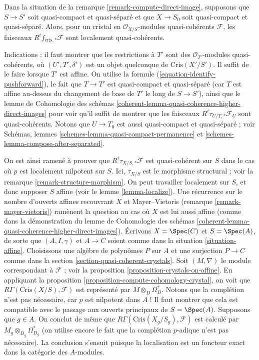 \begin{remark}
\label{remark-quasi-coherent}
Dans la situation de la remarque \ref{remark-compute-direct-image},
supposons que $S \to S'$ soit quasi-compact et quasi-séparé et
que $X \to S_0$ soit quasi-compact et quasi-séparé. Alors, pour un cristal
en $\mathcal{O}_{X/S}$-modules quasi-cohérents $\mathcal{F}$,
les faisceaux $R^if_{\text{cris}, *}\mathcal{F}$ sont localement quasi-cohérents.

\medskip\noindent
Indications : il faut montrer que les restrictions à $T'$ sont des
$\mathcal{O}_{T'}$-modules quasi-cohérents, où $(U', T', \delta')$ est un objet quelconque de
$\text{Cris}(X'/S')$. Il suffit de le faire lorsque $T'$ est affine.
On utilise la formule (\ref{equation-identify-pushforward}),
le fait que $T \to T'$ est quasi-compact et quasi-séparé (car $T$
est affine au-dessus du changement de base de $T'$ le long de $S \to S'$), ainsi que le
lemme de Cohomologie des schémas
\ref{coherent-lemma-quasi-coherence-higher-direct-images}
pour voir qu'il suffit de montrer que les faisceaux
$R^i\tau_{U/T, *}\mathcal{F}_U$ sont quasi-cohérents.
Notons que $U \to T_0$ est aussi quasi-compact et quasi-séparé ; voir
Schémas, lemmes \ref{schemes-lemma-quasi-compact-permanence} et
\ref{schemes-lemma-compose-after-separated}.

\medskip\noindent
On est ainsi ramené à prouver que $R^i\tau_{X/S, *}\mathcal{F}$
est quasi-cohérent sur $S$ dans le cas où $p$ est localement nilpotent sur $S$. Ici,
$\tau_{X/S}$ est le morphisme structural ; voir la
remarque \ref{remark-structure-morphism}.
On peut travailler localement sur $S$, et donc supposer $S$ affine
(voir le lemme \ref{lemma-localize}). Une récurrence sur le nombre
d'ouverts affines recouvrant $X$ et Mayer--Vietoris
(remarque \ref{remark-mayer-vietoris}) ramènent la question
au cas où $X$ est lui aussi affine (comme dans la démonstration du
lemme de Cohomologie des schémas
\ref{coherent-lemma-quasi-coherence-higher-direct-images}).
Écrivons $X = \Spec(C)$ et $S = \Spec(A)$, de sorte que $(A, I, \gamma)$ et
$A \to C$ soient comme
dans la situation \ref{situation-affine}. Choisissons une algèbre de polynômes
$P$ sur $A$ et une surjection $P \to C$ comme dans la
section \ref{section-quasi-coherent-crystals}.
Soit $(M, \nabla)$ le module correspondant à $\mathcal{F}$ ; voir la
proposition \ref{proposition-crystals-on-affine}.
En appliquant la 
proposition \ref{proposition-compute-cohomology-crystal},
on voit que $R\Gamma(\text{Cris}(X/S), \mathcal{F})$ est représenté par
$M \otimes_D \Omega_D^*$. Notons que la complétion n'est pas nécessaire,
car $p$ est nilpotent dans $A$ ! Il faut montrer que cela est compatible
avec le passage aux ouverts principaux de $S = \Spec(A)$. Supposons que $g \in A$.
On conclut de même que $R\Gamma(\text{Cris}(X_g/S_g), \mathcal{F})$
est calculé par $M_g \otimes_{D_g} \Omega_{D_g}^*$ (on utilise encore le fait que
la complétion $p$-adique n'est pas nécessaire). La conclusion s'ensuit puisque la localisation
est un foncteur exact dans la catégorie des $A$-modules.
\end{remark}

